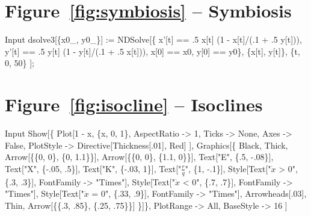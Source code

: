 \documentclass[11pt,fleqn]{book} %
\begin{document}
\section*{Figure~\ref{fig:symbiosis} -- Symbiosis }
\small{
\begin{mmaCell}[index=1]{Input}
  dsolve3[\{x0_, y0_\}] := 
    NDSolve[\{
      x'[t] == .5 x[t] (1 - x[t]/(.1 + .5 y[t])),
      y'[t] == .5 y[t] (1 - y[t]/(.1 + .5 x[t])),
      x[0] == x0,
      y[0] == y0\},
      \{x[t], y[t]\}, \{t, 0, 50\}
    ];
\end{mmaCell}

}

\section*{Figure~\ref{fig:isocline} -- Isoclines }
\small{
\begin{mmaCell}[index=1]{Input}
  Show[\{
    Plot[1 - x, \{x, 0, 1\}, 
      AspectRatio -> 1, 
      Ticks -> None, 
      Axes -> False, 
      PlotStyle -> Directive[Thickness[.01], Red]
    ],
    Graphics[\{
      Black, Thick, Arrow[\{\{0, 0\}, \{0, 1.1\}\}], Arrow[\{\{0, 0\}, \{1.1, 0\}\}],
      Text["E", \{.5, -.08\}], Text["X", \{-.05, .5\}], Text["K", \{-.03, 1\}],
      Text["\(\frac{r}{q}\)", \{1, -.1\}],
      Style[Text["\(\dot{x}\) > 0", \{.3, .3\}], FontFamily -> "Times"],
      Style[Text["\(\dot{x}\) < 0", \{.7, .7\}], FontFamily -> "Times"],
      Style[Text["\(\dot{x}\) = 0", \{.33, .9\}], FontFamily -> "Times"], 
      Arrowheads[.03], Thin, Arrow[\{\{.3, .85\}, \{.25, .75\}\}]
    \}]\}, 
    PlotRange -> All, 
    BaseStyle -> 16
  ]
\end{mmaCell}
}
\end{document}
